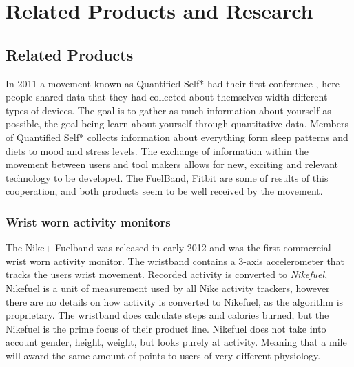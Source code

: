 \chapter{Related Products and Research} %

\label{Chapter3} %


\section{Related Products}
In 2011 a movement known as Quantified Self*\cite{quantfiedSelf} had their first conference \cite{bodyHackers}, here people shared data that they had collected about themselves width different types of devices. The goal is to gather as much information about yourself as possible, the goal being learn about yourself through quantitative data. Members of Quantified Self* collects information about everything form sleep patterns and diets to mood and stress levels.
The exchange of information within the movement between users and tool makers allows for new, exciting and relevant technology to be developed. The FuelBand\cite{fuelBand}, Fitbit\cite{fitBit} are some of results of this cooperation, and both products seem to be well received by the movement. %

\subsection{Wrist worn activity monitors}
The Nike+ Fuelband\cite{fuelBand} was released in early 2012 and was the first commercial wrist worn activity monitor. The wristband contains a 3-axis accelerometer that tracks the users wrist movement. Recorded activity is converted to \emph{Nikefuel}, Nikefuel\cite{nikefuel} is a unit of measurement used by all Nike activity trackers, however there are no details on how activity is converted to Nikefuel, as the algorithm is proprietary. The wristband does calculate steps and calories burned, but the Nikefuel is the prime focus of their product line. Nikefuel does not take into account gender, height, weight, but looks purely at activity. Meaning that a mile will award the same amount of points to users of very different physiology.


